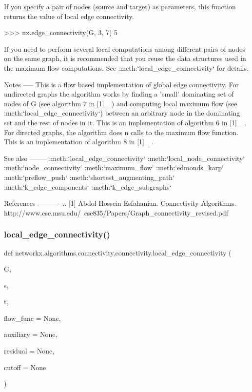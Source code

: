 \begin{DoxyVerb}
If you specify a pair of nodes (source and target) as parameters,
this function returns the value of local edge connectivity.

>>> nx.edge_connectivity(G, 3, 7)
5

If you need to perform several local computations among different
pairs of nodes on the same graph, it is recommended that you reuse
the data structures used in the maximum flow computations. See
:meth:`local_edge_connectivity` for details.

Notes
-----
This is a flow based implementation of global edge connectivity.
For undirected graphs the algorithm works by finding a 'small'
dominating set of nodes of G (see algorithm 7 in [1]_ ) and
computing local maximum flow (see :meth:`local_edge_connectivity`)
between an arbitrary node in the dominating set and the rest of
nodes in it. This is an implementation of algorithm 6 in [1]_ .
For directed graphs, the algorithm does n calls to the maximum
flow function. This is an implementation of algorithm 8 in [1]_ .

See also
--------
:meth:`local_edge_connectivity`
:meth:`local_node_connectivity`
:meth:`node_connectivity`
:meth:`maximum_flow`
:meth:`edmonds_karp`
:meth:`preflow_push`
:meth:`shortest_augmenting_path`
:meth:`k_edge_components`
:meth:`k_edge_subgraphs`

References
----------
.. [1] Abdol-Hossein Esfahanian. Connectivity Algorithms.
    http://www.cse.msu.edu/~cse835/Papers/Graph_connectivity_revised.pdf\end{DoxyVerb}
 \mbox{\label{namespacenetworkx_1_1algorithms_1_1connectivity_1_1connectivity_a161f08d1d45efbffa4096fe164f3942f}} 
\subsubsection{\texorpdfstring{local\+\_\+edge\+\_\+connectivity()}{local\_edge\_connectivity()}}
{\footnotesize\ttfamily def networkx.\+algorithms.\+connectivity.\+connectivity.\+local\+\_\+edge\+\_\+connectivity (\begin{DoxyParamCaption}\item[{}]{G,  }\item[{}]{s,  }\item[{}]{t,  }\item[{}]{flow\+\_\+func = {\ttfamily None},  }\item[{}]{auxiliary = {\ttfamily None},  }\item[{}]{residual = {\ttfamily None},  }\item[{}]{cutoff = {\ttfamily None} }\end{DoxyParamCaption})}

